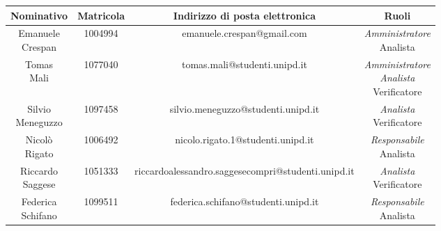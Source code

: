 \begin{center}
	\centering
  \begin{turn}{90}
\begin{tabular}{|c|c|c|c|}
   \hline
		\textbf{Nominativo} & \textbf{Matricola} & \textbf{Indirizzo di posta elettronica} & \textbf{Ruoli}\\

		\hline \makecell{Emanuele \\ Crespan} & 1004994 & emanuele.crespan@gmail.com & \makecell{ \emph{Amministratore} \\Analista} \\
		\hline \makecell{Tomas \\ Mali} & 1077040 & tomas.mali@studenti.unipd.it & \makecell{ \emph{Amministratore} \\ \emph{Analista} \\Verificatore} \\
		\hline \makecell{Silvio \\ Meneguzzo} & 1097458 & silvio.meneguzzo@studenti.unipd.it & \makecell{ \emph{Analista} \\Verificatore} \\
		\hline \makecell{Nicolò \\ Rigato} & 1006492 & nicolo.rigato.1@studenti.unipd.it & \makecell{ \emph{Responsabile} \\Analista} \\
		\hline \makecell{Riccardo \\ Saggese} & 1051333 &  riccardoalessandro.saggesecompri@studenti.unipd.it & \makecell{ \emph{Analista} \\Verificatore} \\
		\hline \makecell{Federica \\ Schifano} & 1099511 &  federica.schifano@studenti.unipd.it & \makecell{ \emph{Responsabile} \\ Analista} \\\hline
\end{tabular}

	\end{turn}
	
	
\end{center}

